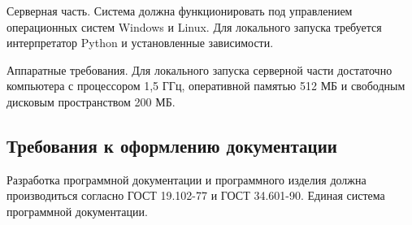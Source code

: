 Серверная часть. Система должна функционировать под управлением операционных систем Windows и Linux. Для локального запуска требуется интерпретатор Python и установленные зависимости.

Аппаратные требования. Для локального запуска серверной части достаточно компьютера с процессором 1,5 ГГц, оперативной памятью 512 МБ и свободным дисковым пространством 200 МБ.

\subsection{Требования к оформлению документации}
Разработка программной документации и программного изделия должна производиться согласно ГОСТ 19.102-77 и ГОСТ 34.601-90. Единая система программной документации.